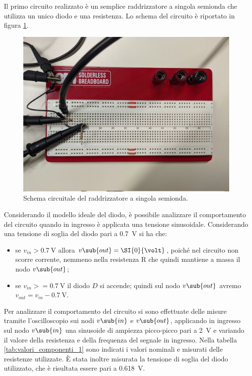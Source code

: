 Il primo circuito realizzato è un semplice raddrizzatore a singola semionda che utilizza un unico diodo e una resistenza. Lo schema del circuito è riportato in figura \ref{fig:circuito_1}.
\begin{figure}[h]
	\centering
	\begin{minipage}{.45\textwidth}
	\end{minipage}\qquad
	\begin{minipage}{.48\textwidth}
	\includegraphics[width=\linewidth]{./ImageFiles/Laboratorio 2/CIR1.jpg}
	\end{minipage}
	\caption{Schema circuitale del raddrizzatore a singola semionda.}
	\label{fig:circuito_1}
\end{figure}
Considerando il modello ideale del diodo, è possibile analizzare il comportamento del circuito quando in ingresso è applicata una tensione sinusoidale. Considerando una tensione di soglia del diodo pari a \SI{0.7}{\volt} si ha che:
\begin{itemize}
	\item se $v_{in}>\SI{0.7}{\volt}$ allora $v\sub{out}=\SI{0}{\volt}$, poiché nel circuito non scorre corrente, nemmeno nella resistenza R che quindi mantiene a massa il nodo $v\sub{out}$;
	\item se $v_{in} >= \SI{0.7}{\volt}$ il diodo $D$ si accende; quindi sul nodo $v\sub{out}$ avremo $v_{out}=v_{in}-\SI{0.7}{\volt}$.
\end{itemize}
Per analizzare il comportamento del circuito si sono effettuate delle misure tramite l'oscilloscopio sui nodi $v\sub{in}$ e $v\sub{out}$, applicando in ingresso sul nodo $v\sub{in}$ una sinusoide di ampiezza picco-picco pari a \SI{2}{\volt} e variando il valore della resistenza e della frequenza del segnale in ingresso. Nella tabella \ref{tab:valori_componenti_1} sono indicati i valori nominali e misurati delle resistenze utilizzate. \`E stata inoltre misurata la tensione di soglia del diodo utilizzato, che è risultata essere pari a \SI{0.618}{\volt}.

